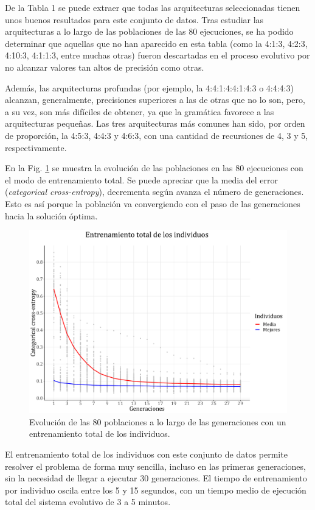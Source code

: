 \documentclass[spanish,a4paper,12pt,twoside]{report}
\begin{document}
  De la Tabla 1 se puede extraer que todas las arquitecturas seleccionadas tienen unos buenos resultados para este conjunto de datos. Tras estudiar las arquitecturas a lo largo de las poblaciones de las 80 ejecuciones, se ha podido determinar que aquellas que no han aparecido en esta tabla (como la 4:1:3, 4:2:3, 4:10:3, 4:1:1:3, entre muchas otras) fueron descartadas en el proceso evolutivo por no alcanzar valores tan altos de precisión como otras. \par
  Además, las arquitecturas profundas (por ejemplo, la 4:4:1:4:4:1:4:3 o 4:4:4:3) alcanzan, generalmente, precisiones superiores a las de otras que no lo son, pero, a su vez, son más difíciles de obtener, ya que la gramática favorece a las arquitecturas pequeñas. Las tres arquitecturas más comunes han sido, por orden de proporción, la 4:5:3, 4:4:3 y 4:6:3, con una cantidad de recursiones de 4, 3 y 5, respectivamente. \par
  En la Fig. \ref{fig:18} se muestra la evolución de las poblaciones en las 80 ejecuciones con el modo de entrenamiento total. Se puede apreciar que la media del error (\emph{categorical cross-entropy}), decrementa según avanza el número de generaciones. Esto es así porque la población va convergiendo con el paso de las generaciones hacia la solución óptima.
  \begin{figure}[H]
    \centering
    \includegraphics[width = 1\textwidth]{resources/Fig18.pdf}
    \caption{Evolución de las 80 poblaciones a lo largo de las generaciones con un entrenamiento total de los individuos.}
    \label{fig:18}
  \end{figure} \par
  El entrenamiento total de los individuos con este conjunto de datos permite resolver el problema de forma muy sencilla, incluso en las primeras generaciones, sin la necesidad de llegar a ejecutar 30 generaciones. El tiempo de entrenamiento por individuo oscila entre los 5 y 15 segundos, con un tiempo medio de ejecución total del sistema evolutivo de 3 a 5 minutos. \par
\end{document}
